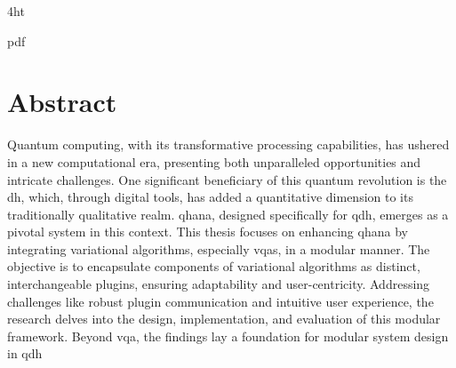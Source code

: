 \documentclass[
  a4paper,  %
  twoside,  %
  bibliography=totoc,
  headsepline,
  cleardoublepage=empty,
  parskip=half,
  draft=false
]{scrbook}
\begin{document}
\iftex4ht
  \Configure{$}{\PicMath}{\EndPicMath}{}

  {pdf}
  {%
  }
\fi



\Titelblatt

\pagestyle{preamble}
\renewcommand*{\chapterpagestyle}{preamble}




\section*{Abstract}
Quantum computing, with its transformative processing capabilities, has ushered in a new computational era, presenting both unparalleled opportunities and intricate challenges.
One significant beneficiary of this quantum revolution is the \gls{dh}, which, through digital tools, has added a quantitative dimension to its traditionally qualitative realm.
\gls{qhana}, designed specifically for \gls{qdh}, emerges as a pivotal system in this context.
This thesis focuses on enhancing \gls{qhana} by integrating variational algorithms, especially \glspl{vqa}, in a modular manner.
The objective is to encapsulate components of variational algorithms as distinct, interchangeable plugins, ensuring adaptability and user-centricity.
Addressing challenges like robust plugin communication and intuitive user experience, the research delves into the design, implementation, and evaluation of this modular framework.
Beyond \gls{vqa}, the findings lay a foundation for modular system design in \gls{qdh}
\end{document}
